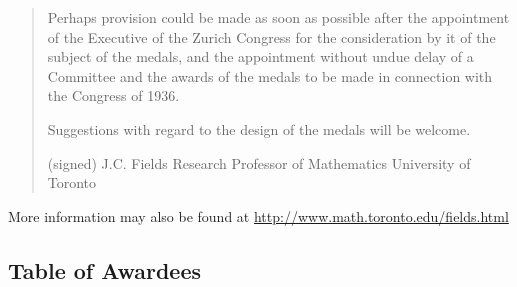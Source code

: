 \begin{quote}
  Perhaps provision could be made as soon as possible after the appointment
of the Executive of the Zurich Congress for the consideration by it of the
subject of the medals, and the appointment without undue delay of a
Committee and the awards of the medals to be made in connection with the
Congress of 1936.

  Suggestions with regard to the design of the medals will be welcome.


                                 (signed)   J.C. Fields
                                            Research Professor of Mathematics
                                            University of Toronto
\end{quote}


More information may also be found at
%
%
\url{http://www.math.toronto.edu/fields.html}

\vfill\pagebreak

\subsection{Table of Awardees}

